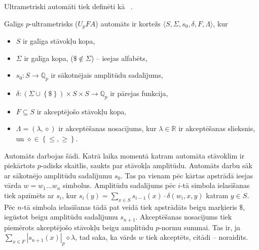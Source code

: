 \documentclass{ludis}
\begin{document}
Ultrametriski automāti tiek definēti kā ~\citep{KasparsBalodis2013}.
\begin{definicija}
Galīgs $p$-ultrametrisks ($U_pFA$) automāts ir kortežs $\langle S, \Sigma, s_0, \delta, F, \Lambda \rangle$, kur
\begin{itemize}
  \item $S$ ir galīga stāvokļu kopa,
  \item $\Sigma$ ir galīga kopa, ($\$ \notin \Sigma$) -- ieejas alfabēts,
  \item $s_0:S \rightarrow \mathbb{Q}_p$ ir sākotnējais amplitūdu sadalījums, %
  \item $\delta: \left( \Sigma \cup \left\{ \$ \right\} \right) \times S \times S \rightarrow \mathbb{Q}_p$ ir pārejas funkcija,
  \item $F \subseteq S$ ir akceptējošo stāvokļu kopa,
  \item $\Lambda = \left( \lambda, \diamond \right)$ ir akceptēšanas nosacījums, kur $\lambda \in \mathbb{R}$ ir akceptēšanas slieksnis, un $\diamond \in \left\{ \leq, \geq \right\}$.
\end{itemize}
Automāts darbojas šādi. %
Katrā laika momentā katram automāta stāvoklim ir piekārtots $p$-adisks skaitlis, saukts par stāvokļa amplitūdu.
Automāts darbu sāk ar sākotnējo amplitūdu sadalījumu $s_0$.
Tas pa vienam pēc kārtas apstrādā ieejas vārda $w = w_1 \ldots w_n$ simbolus.
Amplitūdu sadalījums pēc $i$-tā simbola ielasīšanas tiek apzīmēts ar $s_i$, kur
$s_i(y) = \sum_{x \in S}{s_{i-1}(x) \cdot \delta \left( w_i, x, y \right) }$ katram $y \in S$.
Pēc $n$-tā simbola ielasīšanas tādā pat veidā tiek apstrādāts beigu marķieris $\$$, iegūstot beigu amplitūdu sadalījumu $s_{n+1}$.
Akceptēšanas nosacījums tiek piemērots akceptējošo stāvokļu beigu amplitūdu $p$-normu summai. Tas ir, ja $\sum_{x \in F}{\left| s_{n+1}(x) \right|_p} \diamond \lambda$, tad saka, ka vārds $w$ tiek akceptēts, citādi -- noraidīts.
\end{definicija}
\end{document}
